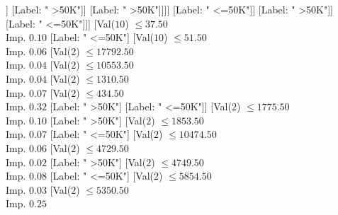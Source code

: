 \documentclass[margin=10pt]{standalone}
\begin{document}
\begin{forest}
													[Label: " <=50K"]
													[Val($2$) $ \leq 16080.50$ \\ Imp. $0.08$
														[Val($2$) $ \leq 14914.50$ \\ Imp. $0.11$
															[Val($2$) $ \leq 10837.50$ \\ Imp. $0.20$
																[Val($2$) $ \leq 700.50$ \\ Imp. $0.06$
																	[Label: " >50K"]
																	[Val($2$) $ \leq 5098.50$ \\ Imp. $0.14$
																		[Label: " <=50K"]
																		[Val($2$) $ \leq 9814.50$ \\ Imp. $0.02$
																			[Val($2$) $ \leq 7567.50$ \\ Imp. $0.17$
																				[Val($2$) $ \leq 6127.50$ \\ Imp. $0.32$
																					[Label: " >50K"]
																					[Label: " <=50K"]]
																				[Label: " >50K"]]
																			[Label: " >50K"]]]]
																[Label: " <=50K"]]
															[Label: " >50K"]]
														[Label: " <=50K"]]]
												[Val($10$) $ \leq 37.50$ \\ Imp. $0.10$
													[Label: " <=50K"]
													[Val($10$) $ \leq 51.50$ \\ Imp. $0.06$
														[Val($2$) $ \leq 17792.50$ \\ Imp. $0.04$
															[Val($2$) $ \leq 10553.50$ \\ Imp. $0.04$
																[Val($2$) $ \leq 1310.50$ \\ Imp. $0.07$
																	[Val($2$) $ \leq 434.50$ \\ Imp. $0.32$
																		[Label: " >50K"]
																		[Label: " <=50K"]]
																	[Val($2$) $ \leq 1775.50$ \\ Imp. $0.10$
																		[Label: " >50K"]
																		[Val($2$) $ \leq 1853.50$ \\ Imp. $0.07$
																			[Label: " <=50K"]
																			[Val($2$) $ \leq 10474.50$ \\ Imp. $0.06$
																				[Val($2$) $ \leq 4729.50$ \\ Imp. $0.02$
																					[Label: " >50K"]
																					[Val($2$) $ \leq 4749.50$ \\ Imp. $0.08$
																						[Label: " <=50K"]
																						[Val($2$) $ \leq 5854.50$ \\ Imp. $0.03$
																							[Val($2$) $ \leq 5350.50$ \\ Imp. $0.25$

\end{forest}
\end{document}
